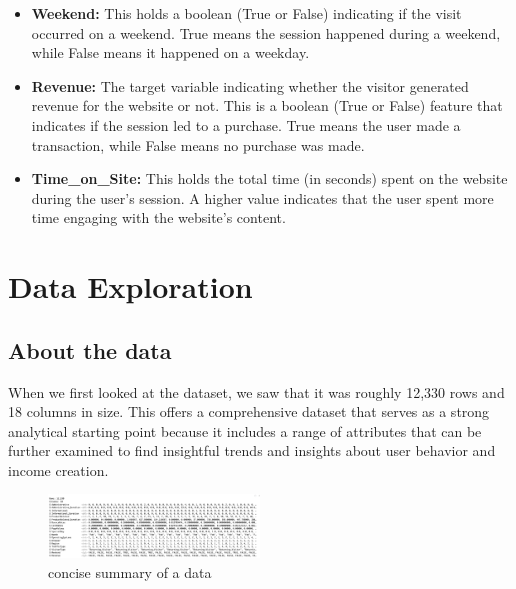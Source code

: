\documentclass[12pt]{article}
\begin{document}
\begin{itemize}
\item \textbf{Weekend:} This holds a boolean (True or False) indicating if the visit occurred on a weekend. True means the session happened during a weekend, while False means it happened on a weekday.

\item \textbf{Revenue:} The target variable indicating whether the visitor generated revenue for the website or not. This is a boolean (True or False) feature that indicates if the session led to a purchase. True means the user made a transaction, while False means no purchase was made.

\item \textbf{Time\_on\_Site:} This holds the total time (in seconds) spent on the website during the user's session. A higher value indicates that the user spent more time engaging with the website's content.
\end{itemize}



\section{Data Exploration}

\subsection{About the data}
When we first looked at the dataset, we saw that it was roughly 12,330 rows and 18 columns in size. This offers a comprehensive dataset that serves as a strong analytical starting point because it includes a range of attributes that can be further examined to find insightful trends and insights about user behavior and income creation.

\begin{figure}[h]
    \centering
    \includegraphics[width=0.5\textwidth]{Screenshot 2024-10-09 at 15.00.28.png}  
    \caption{concise summary of a data }
        \label{fig:example}
   \vspace{0.5cm}
   \end{figure}

   
     
\end{document}
